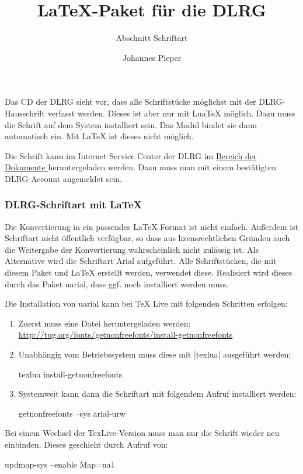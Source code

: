 \documentclass[
    a4paper,
    12pt,
    parskip=half,
]{scrartcl}
\title{\LaTeX{}-Paket für die DLRG}
\subtitle{Abschnitt Schriftart}
\author{Johannes Pieper}
\begin{document}
Das CD der DLRG sieht vor, dass alle Schriftstücke möglichst mit der DLRG-Hausschrift verfasst werden. Dieses ist aber nur mit LuaTeX möglich. Dazu muss die Schrift auf dem System installiert sein. Das Modul bindet sie dann automatisch ein. Mit \LaTeX{} ist dieses nicht möglich.

Die Schrift kann im Internet Service Center der DLRG im \href{https://dlrg.net/apps/dokumente?page=assetService&noheader=1&aid=1709&v=o&file=DLRG%20Schriftart.zip}{Bereich der Dokumente } heruntergeladen werden. Dazu muss man mit einem bestätigten DLRG-Account angemeldet sein.

\subsubsection{DLRG-Schriftart mit \LaTeX}
Die Konvertierung in ein passendes \LaTeX{} Format ist nicht einfach. Außerdem ist Schriftart nicht öffentlich verfügbar, so dass aus lizensrechtlichen Gründen auch die Weitergabe der Konvertierung wahrscheinlich nicht zulässig ist. Als Alternative wird die Schriftart Arial aufgeführt. Alle Schriftstücken, die mit diesem Paket und \LaTeX{} erstellt werden, verwendet diese. Realisiert wird dieses durch das Paket uarial, dass ggf. noch installiert werden muss.

Die Installation von uarial kann bei TeX Live mit folgenden Schritten erfolgen:
\begin{enumerate}
    \item Zuerst muss eine Datei heruntergeladen werden: \\
        \url{http://tug.org/fonts/getnonfreefonts/install-getnonfreefonts}
    \item Unabhängig vom Betriebssystem muss diese mit \verbcode|texlua| ausgeführt werden:
    \begin{sourcecode}[gobble=8]
        texlua install-getnonfreefonts
    \end{sourcecode}
    \item Systemweit kann dann die Schriftart mit folgendem Aufruf installiert werden:
    \begin{sourcecode}[gobble=8]
        getnonfreefonts --sys arial-urw
    \end{sourcecode}
\end{enumerate}

Bei einem Wechsel der TexLive-Version muss man nur die Schrift wieder neu einbinden. Dieses geschieht durch Aufruf von:
\begin{sourcecode}[gobble=4]
    updmap-sys --enable Map=ua1
\end{sourcecode}
\end{document}
